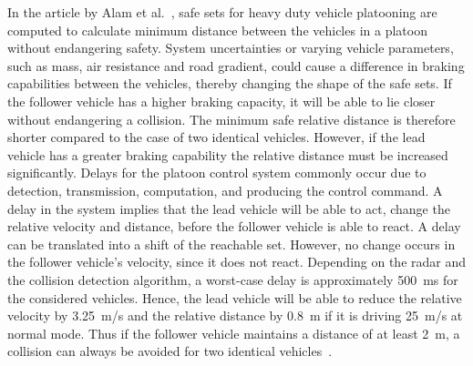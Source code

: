 In the article by Alam et al.~\cite{johansson2013}, safe sets for heavy duty vehicle platooning are computed to calculate minimum distance between the  vehicles in a platoon without endangering safety. System uncertainties or varying vehicle parameters, such as mass, air resistance and road gradient, could cause a difference in braking capabilities between the vehicles, thereby changing the shape of the safe sets. If the follower vehicle has a higher braking capacity, it will be able to lie closer without endangering a collision. The minimum safe relative distance is therefore shorter compared to the case of two identical vehicles. However, if the lead vehicle has a greater braking capability the relative distance must be increased significantly. Delays for the platoon control system commonly occur due to detection, transmission, computation, and producing the control command. A delay in the system implies that the lead vehicle will be able to act, change the relative velocity and distance, before the follower vehicle is able to react. A delay can be translated into a shift of the reachable set. However, no change occurs in the follower vehicle's velocity, since it does not react. Depending on the radar and the collision detection algorithm, a worst-case delay is approximately 500~ms for the considered vehicles. Hence, the lead vehicle will be able to reduce the relative velocity by 3.25~m/s and the relative distance by 0.8~m if it is driving 25~m/s at normal mode. Thus if the follower vehicle maintains a distance of at least 2~m, a collision can always be avoided for two identical vehicles~\cite{johansson2013}.

